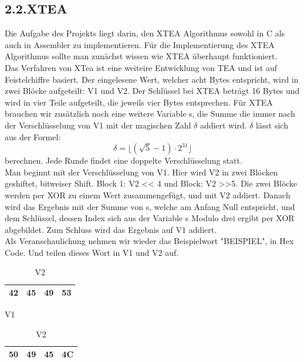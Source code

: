 \documentclass[course=asp]{aspdoc}
\begin{document}
\subsection*{2.2.XTEA}
Die Aufgabe des Projekts liegt darin, den XTEA Algorithmus sowohl in C als auch in Assembler zu implementieren. Für die Implementierung des XTEA Algorithmus sollte man zunächst wissen wie XTEA überhaupt funktioniert. \\
Das Verfahren von XTea ist eine weiteire Entwicklung von TEA und ist auf Feistelchiffre basiert. Der eingelesene Wert, welcher acht Bytes entspricht, wird in zwei Blöcke aufgeteilt: V1 und V2. Der Schlüssel bei XTEA beträgt 16 Bytes und wird in vier Teile aufgeteilt, die jeweils vier Bytes entsprechen. Für XTEA brauchen wir zusätzlich noch eine weitere Variable s, die Summe die immer nach der Verschlüsselung von V1 mit der magischen Zahl ${\delta}$ addiert wird. ${\delta}$ lässt sich aus der Formel:
\begin{equation}
     \delta  =   \lfloor ( \surd 5 -1)  \cdot  2^{31} \rfloor
\end{equation}
berechnen. Jede Runde findet eine doppelte Verschlüsselung statt.~\cite{appel2016sicherheitsaspekte} \\
Man beginnt mit der Verschlüsselung von V1. Hier wird V2 in zwei Blöcken geshiftet, bitweiser Shift. Block 1: V2 << 4 und Block: V2 >>5. Die zwei Blöcke werden per XOR  zu einem Wert zusammengefügt, und mit V2 addiert. Danach wird das Ergebnis mit der Summe von s, welche am Anfang Null entspricht, und dem Schlüssel, dessen Index sich aus der Variable s Modulo drei ergibt per XOR abgebildet. Zum Schluss wird das Ergebnis auf V1 addiert. \\
Als Veranschaulichung nehmen wir wieder das Beispielwort "BEISPIEL", in Hex Code. Und teilen dieses Wort in V1 und V2 auf.
\begin{table}[H]

    \begin{minipage}{.5\linewidth}

      \centering
        \begin{tabular}{|l|l|l|l|}
		\hline
            42 & 45 & 49 & 53   \\
		\hline
        \end{tabular}

	\caption{V1}
    \end{minipage}%
    \begin{minipage}{.5\linewidth}

 \centering

        \begin{tabular}{|l|l|l|l|}
           \hline
		 50 & 49 & 45 & 4C   \\
		\hline
        \end{tabular}
\caption{V2}
    \end{minipage}
\end{table}
\end{document}

